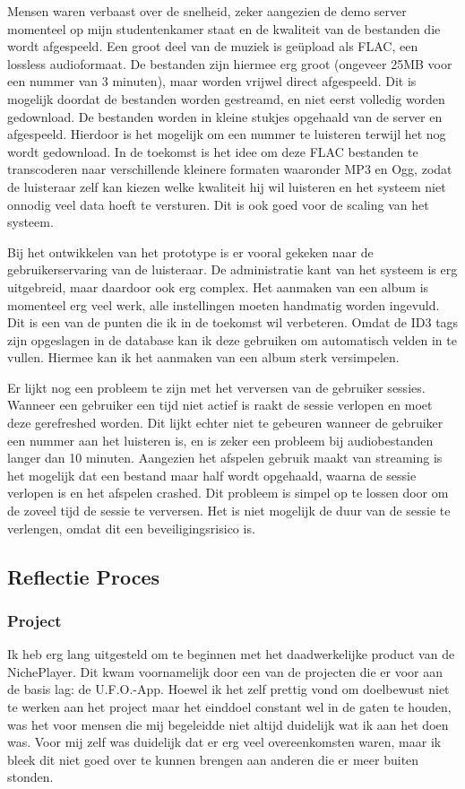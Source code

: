 Mensen waren verbaast over de snelheid, zeker aangezien de demo server momenteel op mijn studentenkamer staat en de kwaliteit van de bestanden die wordt afgespeeld. Een groot deel van de muziek is geüpload als FLAC, een lossless audioformaat. De bestanden zijn hiermee erg groot (ongeveer 25MB voor een nummer van 3 minuten), maar worden vrijwel direct afgespeeld. Dit is mogelijk doordat de bestanden worden gestreamd, en niet eerst volledig worden gedownload. De bestanden worden in kleine stukjes opgehaald van de server en afgespeeld. Hierdoor is het mogelijk om een nummer te luisteren terwijl het nog wordt gedownload. In de toekomst is het idee om deze FLAC bestanden te transcoderen naar verschillende kleinere formaten waaronder MP3 en Ogg, zodat de luisteraar zelf kan kiezen welke kwaliteit hij wil luisteren en het systeem niet onnodig veel data hoeft te versturen. Dit is ook goed voor de scaling van het systeem.

Bij het ontwikkelen van het prototype is er vooral gekeken naar de gebruikerservaring van de luisteraar. De administratie kant van het systeem is erg uitgebreid, maar daardoor ook erg complex. Het aanmaken van een album is momenteel erg veel werk, alle instellingen moeten handmatig worden ingevuld. Dit is een van de punten die ik in de toekomst wil verbeteren. Omdat de ID3 tags zijn opgeslagen in de database kan ik deze gebruiken om automatisch velden in te vullen. Hiermee kan ik het aanmaken van een album sterk versimpelen.

Er lijkt nog een probleem te zijn met het verversen van de gebruiker sessies. Wanneer een gebruiker een tijd niet actief is raakt de sessie verlopen en moet deze gerefreshed worden. Dit lijkt echter niet te gebeuren wanneer de gebruiker een nummer aan het luisteren is, en is zeker een probleem bij audiobestanden langer dan 10 minuten. Aangezien het afspelen gebruik maakt van streaming is het mogelijk dat een bestand maar half wordt opgehaald, waarna de sessie verlopen is en het afspelen crashed. Dit probleem is simpel op te lossen door om de zoveel tijd de sessie te verversen. Het is niet mogelijk de duur van de sessie te verlengen, omdat dit een beveiligingsrisico is.

\subsection{Reflectie Proces}

\subsubsection*{Project}
Ik heb erg lang uitgesteld om te beginnen met het daadwerkelijke product van de NichePlayer. Dit kwam voornamelijk door een van de projecten die er voor aan de basis lag: de U.F.O.-App. Hoewel ik het zelf prettig vond om doelbewust niet te werken aan het project maar het einddoel constant wel in de gaten te houden, was het voor mensen die mij begeleidde niet altijd duidelijk wat ik aan het doen was. Voor mij zelf was duidelijk dat er erg veel overeenkomsten waren, maar ik bleek dit niet goed over te kunnen brengen aan anderen die er meer buiten stonden.

